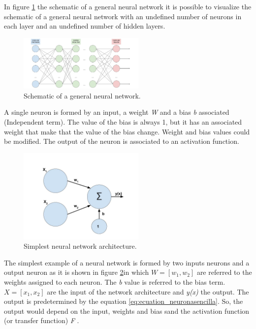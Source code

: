 In figure \ref{fig:esquemaneuronal} the schematic of a general neural network it is possible to visualize the schematic of a general neural network with an undefined number of neurons in each layer and an undefined number of hidden layers.\\

\begin{figure}[htb]
\centering
\includegraphics[width=0.55\textwidth]{images_miscelaneus/red_neuronal.jpg}
\caption{Schematic of a general neural network.} \label{fig:esquemaneuronal}
\end{figure}

A single neuron is formed by an input, a weight \textit{W} and a bias \textit{b} associated (Independent term). The value of the bias is always 1, but it has an associated weight that make that the value of the bias change. Weight and bias values could be modified. The output of the neuron is associated to an activation function. \\

\begin{figure}[htb]
\centering
\includegraphics[width=0.55\textwidth]{images_miscelaneus/neurona_sencilla.jpg}
\caption{Simplest neural network architecture.} \label{fig:neuronasencilla}
\end{figure}

The simplest example of a neural network is formed by two inputs neurons and a output neuron as it is shown in figure \ref{fig:neuronasencilla}in which \textit{$W=[w_1,w_2]$} are referred to the weights assigned to each neuron. The \textit{b} value is referred to the bias term. \textit{$X=[x_{1},x_{2}]$} are the input of the network architecture and \textit{y(x)} the output. The output is predetermined by the equation \ref{eq:ecuation_neuronasencilla}. So, the output would depend on the input, weights and bias sand the activation function (or transfer function) \textit{F} \cite{krose}. \\

